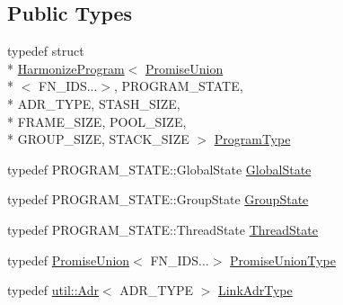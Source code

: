 \subsection*{Public Types}
\begin{DoxyCompactItemize}
\item 
typedef struct \\*
\hyperlink{structHarmonizeProgram}{Harmonize\-Program}$<$ \hyperlink{unionPromiseUnion}{Promise\-Union}\\*
$<$ F\-N\-\_\-\-I\-D\-S...$>$, P\-R\-O\-G\-R\-A\-M\-\_\-\-S\-T\-A\-T\-E, \\*
A\-D\-R\-\_\-\-T\-Y\-P\-E, S\-T\-A\-S\-H\-\_\-\-S\-I\-Z\-E, \\*
F\-R\-A\-M\-E\-\_\-\-S\-I\-Z\-E, P\-O\-O\-L\-\_\-\-S\-I\-Z\-E, \\*
G\-R\-O\-U\-P\-\_\-\-S\-I\-Z\-E, S\-T\-A\-C\-K\-\_\-\-S\-I\-Z\-E $>$ \hyperlink{structHarmonizeProgram_3_01PromiseUnion_3_01FN__IDS_8_8_8_4_00	PROGRAM__STATE_00	ADR__TYPE_00	ST96305cc1a177b714bc64a5044f46c97c_a221a90c8933fd67a1e48604b89e2f6fe}{Program\-Type}
\item 
typedef P\-R\-O\-G\-R\-A\-M\-\_\-\-S\-T\-A\-T\-E\-::\-Global\-State \hyperlink{structHarmonizeProgram_3_01PromiseUnion_3_01FN__IDS_8_8_8_4_00	PROGRAM__STATE_00	ADR__TYPE_00	ST96305cc1a177b714bc64a5044f46c97c_ad7d9f7be9e75c070fe6b85be51f6d053}{Global\-State}
\item 
typedef P\-R\-O\-G\-R\-A\-M\-\_\-\-S\-T\-A\-T\-E\-::\-Group\-State \hyperlink{structHarmonizeProgram_3_01PromiseUnion_3_01FN__IDS_8_8_8_4_00	PROGRAM__STATE_00	ADR__TYPE_00	ST96305cc1a177b714bc64a5044f46c97c_aa0da43109c0152c9b6da39701e52856f}{Group\-State}
\item 
typedef P\-R\-O\-G\-R\-A\-M\-\_\-\-S\-T\-A\-T\-E\-::\-Thread\-State \hyperlink{structHarmonizeProgram_3_01PromiseUnion_3_01FN__IDS_8_8_8_4_00	PROGRAM__STATE_00	ADR__TYPE_00	ST96305cc1a177b714bc64a5044f46c97c_a16e744d042f3be72dc5da471ce8cafc6}{Thread\-State}
\item 
typedef \hyperlink{unionPromiseUnion}{Promise\-Union}$<$ F\-N\-\_\-\-I\-D\-S...$>$ \hyperlink{structHarmonizeProgram_3_01PromiseUnion_3_01FN__IDS_8_8_8_4_00	PROGRAM__STATE_00	ADR__TYPE_00	ST96305cc1a177b714bc64a5044f46c97c_a9ed971681cf35354ed9a935b1e05bb23}{Promise\-Union\-Type}
\item 
typedef \hyperlink{structutil_1_1Adr}{util\-::\-Adr}$<$ A\-D\-R\-\_\-\-T\-Y\-P\-E $>$ \hyperlink{structHarmonizeProgram_3_01PromiseUnion_3_01FN__IDS_8_8_8_4_00	PROGRAM__STATE_00	ADR__TYPE_00	ST96305cc1a177b714bc64a5044f46c97c_a4d8821dc6e61a340560067db6a3c6d09}{Link\-Adr\-Type}

\end{DoxyCompactItemize}
